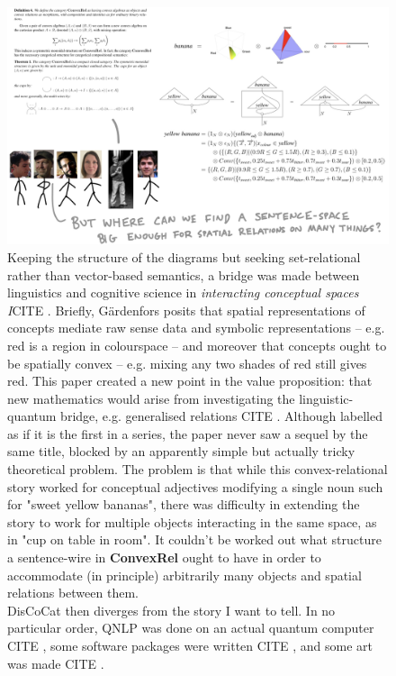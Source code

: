 \begin{figure}[h!]
\includegraphics{figures/cartoons/disco3}
\caption{Keeping the structure of the diagrams but seeking set-relational rather than vector-based semantics, a bridge was made between linguistics and cognitive science in \emph{interacting conceptual spaces I}\bR CITE \e. Briefly, G\"{a}rdenfors posits that spatial representations of concepts mediate raw sense data and symbolic representations -- e.g. red is a region in colourspace -- and moreover that concepts ought to be spatially convex -- e.g. mixing any two shades of red still gives red. This paper created a new point in the value proposition: that new mathematics would arise from investigating the linguistic-quantum bridge, e.g. generalised relations \bR CITE \e. Although labelled as if it is the first in a series, the paper never saw a sequel by the same title, blocked by an apparently simple but actually tricky theoretical problem. The problem is that while this convex-relational story worked for conceptual adjectives modifying a single noun such for "sweet yellow bananas", there was difficulty in extending the story to work for multiple objects interacting in the same space, as in "cup on table in room". It couldn't be worked out what structure a sentence-wire in \textbf{ConvexRel} ought to have in order to accommodate (in principle) arbitrarily many objects and spatial relations between them.\\

DisCoCat then diverges from the story I want to tell. In no particular order, QNLP was done on an actual quantum computer \bR CITE \e, some software packages were written \bR CITE \e, and some art was made \bR CITE \e.}
\end{figure}
\clearpage



